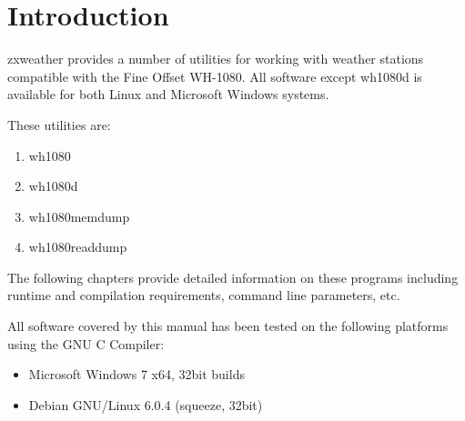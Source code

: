 \documentclass[a4paper,10pt,draft]{book}
\newcommand{\partnumber}{\ifthenelse{\isundefined{\projectnum}}{}{\projectnum-\docnum	\ifthenelse{\equal{\docrev}{001}}{}{.\docrev}}}
\begin{document}

\ifthenelse{\isundefined{\ordernumber}}{

\title{\doctitle{} - \docsubtitle}
\author{\docauthor}
}{

\title{\doctitle}
\subtitle{\docsubtitle}
\titleabstract{\docabstract}
\ordernumber{\partnumber}
\updateinfo{\docupdateinfo}
\osinfo{\docosver}
\swversion{\docswver}
\titlecopyright{\doccopyright}
\licensestatement{\doclicense}
}
\date{\docdate}

\maketitle

\clearpage

\tableofcontents
\clearpage


\chapter{Introduction}
\setcounter{page}{1}

zxweather provides a number of utilities for working with weather stations compatible with the Fine Offset WH-1080. All software except wh1080d is available for both Linux and Microsoft Windows systems.

These utilities are:
\begin{enumerate}
\item wh1080
\item wh1080d
\item wh1080memdump
\item wh1080readdump
\end{enumerate}

The following chapters provide detailed information on these programs including runtime and compilation requirements, command line parameters, etc.

All software covered by this manual has been tested on the following platforms using the GNU C Compiler:
\begin{itemize}
\item Microsoft Windows 7 x64, 32bit builds
\item Debian GNU/Linux 6.0.4 (squeeze, 32bit)
\end{itemize}
\end{document}

